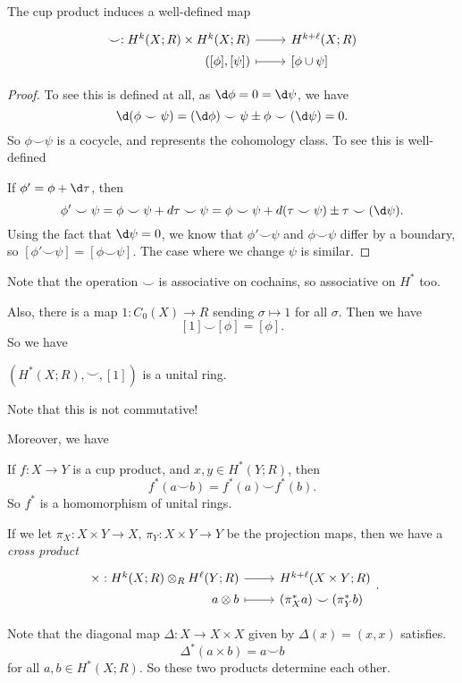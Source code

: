 \documentclass[a4paper]{article}
\begin{document}
\begin{cor}
  The cup product induces a well-defined map
  \[
    \begin{tikzcd}[row sep = 0ex
        ,/tikz/column 1/.append style={anchor=base east}
        ,/tikz/column 2/.append style={anchor=base west}
      ]
      \smile: H^k(X; R) \times H^k(X; R) \ar[r] & H^{k + \ell}(X; R)\\
      ([\phi], [\psi] ) \ar[r, maps to] & \lbrack\phi \cup \psi\rbrack
    \end{tikzcd}
  \]
\end{cor}

\begin{proof}
  To see this is defined at all, as $\d \phi = 0 = \d \psi$, we have
  \[
    \d (\phi \smile \psi) = (\d \phi) \smile \psi \pm \phi \smile (\d \psi) = 0.
  \]
  So $\phi \smile \psi$ is a cocycle, and represents the cohomology class. To see this is well-defined

  If $\phi' = \phi + \d\tau$, then
  \[
    \phi' \smile \psi = \phi \smile \psi + d \tau \smile \psi = \phi \smile \psi + d(\tau \smile \psi) \pm \tau \smile (\d \psi).
  \]
  Using the fact that $\d \psi = 0$, we know that $\phi' \smile \psi$ and $\phi \smile \psi$ differ by a boundary, so $[\phi' \smile \psi] = [\phi \smile \psi]$. The case where we change $\psi$ is similar.
\end{proof}

Note that the operation $\smile$ is associative on cochains, so associative on $H^*$ too.

Also, there is a map $1: C_0(X) \to R$ sending $\sigma \mapsto 1$ for all $\sigma$. Then we have
\[
  [1] \smile [\phi] = [\phi].
\]
So we have
\begin{prop}
  $(H^*(X; R), \smile, [1])$ is a unital ring.
\end{prop}
Note that this is not commutative!

Moreover, we have
\begin{prop}
  If $f: X \to Y$ is a cup product, and $x, y \in H^*(Y; R)$, then
  \[
    f^*(a \smile b) = f^*(a) \smile f^*(b).
  \]
  So $f^*$ is a homomorphism of unital rings.
\end{prop}

\begin{defi}
  If we let $\pi_X: X \times Y \to X$, $\pi_Y: X \times Y\to Y$ be the projection maps, then we have a \emph{cross product}
  \[
    \begin{tikzcd}[row sep = 0ex
        ,/tikz/column 1/.append style={anchor=base east}
        ,/tikz/column 2/.append style={anchor=base west}
      ]
      \times: H^k(X; R) \otimes_R H^\ell(Y; R) \ar[r] & H^{k + \ell}(X \times Y; R)\\
      a \otimes b \ar[r, maps to] & (\pi_X^* a) \smile (\pi_Y^* b)
    \end{tikzcd}.
  \]
\end{defi}
Note that the diagonal map $\Delta: X \to X \times X$ given by $\Delta(x) = (x, x)$ satisfies.
\[
  \Delta^*(a \times b) = a \smile b
\]
for all $a, b \in H^*(X; R)$. So these two products determine each other.
\end{document}
